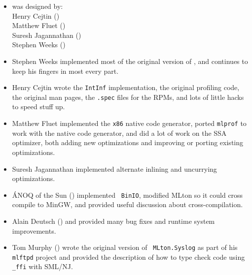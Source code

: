 
\begin{itemize}

\item
{\mlton} was designed by:\\
\hspace*{2em}Henry Cejtin ()\\
\hspace*{2em}Matthew Fluet ()\\
\hspace*{2em}Suresh Jagannathan ()\\
\hspace*{2em}Stephen Weeks ()

\item
Stephen Weeks implemented most of the original version of {\mlton}, and
continues to keep his fingers in most every part.

\item
Henry Cejtin wrote the {\tt IntInf} implementation,
the original profiling code,
the original man pages,
the {\tt .spec} files for the RPMs,
and lots of little hacks to speed stuff up.

\item
Matthew Fluet implemented the {\tt x86} native code generator,
ported {\tt mlprof} to work with the native code generator,
and did a lot of work on the SSA optimizer, both adding new optimizations
and improving or porting existing optimizations.

\item
Suresh Jagannathan implemented alternate inlining and uncurrying optimizations.

\item
\'{A}NOQ of the Sun () implemented {\tt
BinIO}, modified MLton so it could cross compile to MinGW, and provided useful
discussion about cross-compilation.

\item
Alain Deutsch () and  provided many bug fixes and
runtime system improvements.

\item
Tom Murphy () wrote the original version of {\tt
MLton.Syslog} as part of his {\tt mlftpd} project and provided the description
of how to type check code using {\tt \_ffi} with SML/NJ.


\end{itemize}
